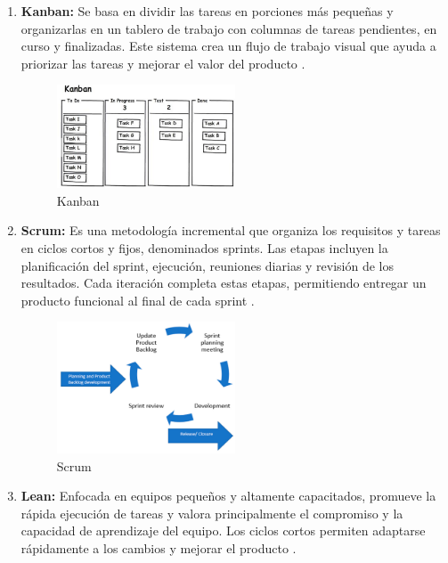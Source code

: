 \begin{enumerate}
    \item \textbf{Kanban:} Se basa en dividir las tareas en porciones más pequeñas y organizarlas en un tablero de trabajo con columnas de tareas pendientes, en curso y finalizadas. Este sistema crea un flujo de trabajo visual que ayuda a priorizar las tareas y mejorar el valor del producto \cite{kanban_img}.

          \begin{figure}[H]
              \centering
              \includegraphics[width=0.5\textwidth]{imagenes/Kanban.png}
              \caption{Kanban}
              \label{fig:kanban}
          \end{figure}

    \item \textbf{Scrum:} Es una metodología incremental que organiza los requisitos y tareas en ciclos cortos y fijos, denominados sprints. Las etapas incluyen la planificación del sprint, ejecución, reuniones diarias y revisión de los resultados. Cada iteración completa estas etapas, permitiendo entregar un producto funcional al final de cada sprint \cite{scrum_img}.

          \begin{figure}[H]
              \centering
              \includegraphics[width=0.5\textwidth]{imagenes/Scrum.jpg}
              \caption{Scrum}
              \label{fig:scrum}
          \end{figure}

    \item \textbf{Lean:} Enfocada en equipos pequeños y altamente capacitados, promueve la rápida ejecución de tareas y valora principalmente el compromiso y la capacidad de aprendizaje del equipo. Los ciclos cortos permiten adaptarse rápidamente a los cambios y mejorar el producto \cite{lean_img}.


\end{enumerate}
